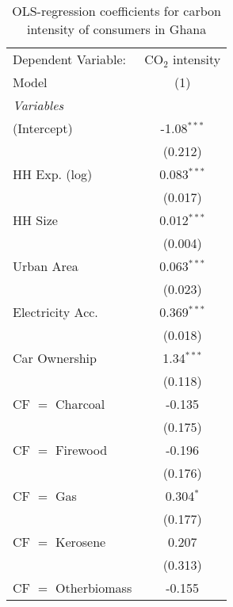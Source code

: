 
\begin{table}[htbp!]
   \centering
   \small
   \begin{adjustbox}{width = 1\textwidth, max height = 0.95\textheight, center}
      \begin{threeparttable}[b]
         \caption{\label{tab:OLS_1_GHA} OLS-regression coefficients for carbon intensity of consumers in Ghana}
         \begin{tabular}{lc}
            \tabularnewline \midrule \midrule
            Dependent Variable: & CO$_{2}$ intensity\\  
            Model               & (1)\\  
            \midrule
            \emph{Variables}\\
            (Intercept)         & -1.08$^{***}$\\   
                                & (0.212)\\   
            HH Exp. (log)       & 0.083$^{***}$\\   
                                & (0.017)\\   
            HH Size             & 0.012$^{***}$\\   
                                & (0.004)\\   
            Urban Area          & 0.063$^{***}$\\   
                                & (0.023)\\   
            Electricity Acc.    & 0.369$^{***}$\\   
                                & (0.018)\\   
            Car Ownership       & 1.34$^{***}$\\   
                                & (0.118)\\   
            CF $=$ Charcoal     & -0.135\\   
                                & (0.175)\\   
            CF $=$ Firewood     & -0.196\\   
                                & (0.176)\\   
            CF $=$ Gas          & 0.304$^{*}$\\   
                                & (0.177)\\   
            CF $=$ Kerosene     & 0.207\\   
                                & (0.313)\\   
            CF $=$ Otherbiomass & -0.155\\   

\end{tabular}
\end{threeparttable}
\end{adjustbox}
\end{table}
